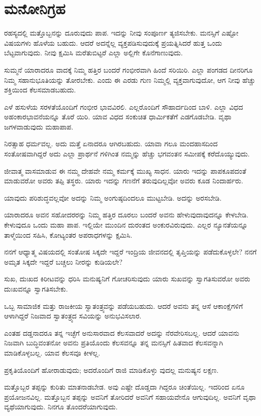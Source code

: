 \section{ಮನೋನಿಗ್ರಹ}

ರಹಸ್ಯದಲ್ಲಿ ಮತ್ತೊಬ್ಬನನ್ನು ದೂರುವುದು ಪಾಪ. ಇದನ್ನು ನೀವು ಸಂಪೂರ್ಣ ತ್ಯಜಿಸಬೇಕು. ಮನಸ್ಸಿಗೆ ಎಷ್ಟೋ ವಿಷಯಗಳು ಹೊಳೆಯ ಬಹುದು. ಆದರೆ ಅದನ್ನೆಲ್ಲ ವ್ಯಕ್ತಪಡಿಸುವುದುಕ್ಕೆ ಪ್ರಯತ್ನಿಸಿದರೆ ಹುತ್ತ ಒಂದು ಬೆಟ್ಟವಾಗುವುದು. ನೀವು ಕ್ಷಮಿಸಿ ಮರೆತುಬಿಟ್ಟರೆ ಎಲ್ಲಾ ಅಲ್ಲಿಗೇ ಕೊನೆಗಾಣುವುದು.

ಸುಮ್ಮನೆ ಯಾರಾದರೂ ವಾದಕ್ಕೆ ನಿಮ್ಮ ಹತ್ತಿರ ಬಂದರೆ ಗಂಭೀರವಾಗಿ ಹಿಂದೆ ಸರಿಯಿರಿ. ಎಲ್ಲಾ ಪಂಗಡದ ದೀನರಿಗೂ ನಿಮ್ಮ ಸಹಾನುಭೂತಿಯನ್ನು ತೋರಬೇಕು. ಎಂದು ಈ ಎರಡು ಗುಣ ನಿಮ್ಮಲ್ಲಿ ವ್ಯಕ್ತವಾಗುವುದೋ, ಆಗ ನೀವು ಹೆಚ್ಚು ಶಕ್ತಿಯಿಂದ ಕೆಲಸಮಾಡಬಹುದು.

ಎಳೆ ಹಸುಳೆಯ ಸರಳತೆಯೊಂದಿಗೆ ಗಂಭೀರ ಭಾವವಿರಲಿ. ಎಲ್ಲರೊಂದಿಗೆ ಸೌಹಾರ್ದದಿಂದ ಬಾಳಿ. ಎಲ್ಲಾ ವಿಧದ ಅಹಂಕಾರಭಾವನೆಯನ್ನೂ ತೊರೆ ಯಿರಿ. ಯಾವ ವಿಧದ ಸಂಕುಚಿತ ಧಾರ್ಮಿಕತೆಗೆ ಎಡಗೊಡಬೇಡಿ. ವೃಥಾ ಜಗಳವಾಡುವುದು ಮಹಾಪಾಪ.

ನಿರತ್ಸಾಹ ಧರ್ಮವಲ್ಲ. ಅದು ಮತ್ತೆ ಏನಾದರೂ ಆಗಿರಬಹುದು. ಯಾವಾ ಗಲೂ ಮಂದಹಾಸದಿಂದ ಸಂತೋಷವಾಗಿದ್ದರೆ ಅದು ಎಲ್ಲಾ ಪ್ರಾರ್ಥನೆ ಗಳಿಗಿಂತ ನಮ್ಮನ್ನು ಹೆಚ್ಚು ಭಗವಂತನ ಸಮೀಪಕ್ಕೆ ಕರೆದೊಯ್ಯುವುದು.

ಜೀವಾತ್ಮ ವಾಸಮಾಡುವ ಈ ನಮ್ಮ ದೇಹವೇ ನಮ್ಮ ಕರ್ಮಕ್ಕೆ ಮುಖ್ಯ ಸಾಧನ. ಯಾರು ಇದನ್ನು ಪಾಪಕೂಪದಂತೆ ಮಾಡುವರೋ ಅವರು ತಪ್ಪಿ ತಸ್ಥರು. ಯಾರು ಇದನ್ನು ಗಣನೆಗೆ ತರುವುದಿಲ್ಲವೋ ಅವರು ಕೂಡ ನಿಂದಾರ್ಹರು.

ಯಾವುದು ಪರಿಶುದ್ಧವಲ್ಲವೋ ಅದನ್ನು ನಿಮ್ಮ ಅಂಗುಷ್ಠದಿಂದಲೂ ಮುಟ್ಟಬೇಡಿ. ಅದನ್ನು ಅರಸಬೇಡಿ.

ಯಾರಾದರೂ ಅವನ ಸಹೋದರರನ್ನು ನಿಮ್ಮ ಹತ್ತಿರ ದೂರಲು ಬಂದರೆ ಅವನು ಹೇಳುವುದಾವುದನ್ನೂ ಕೇಳಬೇಡಿ. ಕೇಳುವುದೂ ಒಂದು ಮಹಾ ಪಾಪ. ಇಲ್ಲಿಯೇ ಮುಂದಿನ ದುರಂತದ ಅಂಕುರವಿರುವುದು. ಎಲ್ಲರ ನ್ಯೂನತೆಯನ್ನೂ ತಾಳ್ಮೆಯಿಂದ ಸಹಿಸಿ, ಕೋಟ್ಯಂತರ ಅಪರಾಧಗಳನ್ನು ಕ್ಷಮಿಸಿ.

ನನಗೆ ಆಧ್ಯಾತ್ಮ ವಿಷಯದಲ್ಲಿ ಸಂತೋಷ ಸಿಕ್ಕದೇ ಇದ್ದರೆ ಇಂದ್ರಿಯ ಜೀವನದಲ್ಲಿ ತೃಪ್ತಿಯನ್ನು ಪಡೆದುಕೊಳ್ಳಲೇ? ನನಗೆ ಅಮೃತ ಸಿಕ್ಕದೇ ಇದ್ದರೆ ಬಚ್ಚಲು ನೀರನ್ನು ಕುಡಿಯಲೇ?

ಸುಖ, ದುಃಖದ ಕಿರೀಟವನ್ನು ಧರಿಸಿ ಮನುಷ್ಯನಿಗೆ ಗೋಚರಿಸುವುದು ಯಾರು ಸುಖವನ್ನು ಸ್ವಾಗತಿಸುವರೋ ಅವರು ದುಃಖವನ್ನೂ ಸ್ವಾಗತಿಸಬೇಕು.

ಒಬ್ಬ ಸಾಮಾಜಿಕ ಮತ್ತು ರಾಜಕೀಯ ಸ್ವಾತಂತ್ರ್ಯವನ್ನು ಪಡೆಯಬಹುದು. ಆದರೆ ಅವನು ತನ್ನ ಆಸೆ ಆಕಾಂಕ್ಷೆಗಳಿಗೆ ಆಳಾಗಿದ್ದರೆ ನಿಜವಾದ ಸ್ವಾತಂತ್ರ್ಯದ ಸವಿಯನ್ನು ಅನುಭವಿಸಲಾರ.

ಎಂತಹ ದಡ್ಡನಾದರೂ ತನ್ನ ಇಚ್ಛೆಗೆ ಅನುಸಾರವಾದ ಕೆಲಸವಾದರೆ ಅದನ್ನು ನೆರವೇರಿಸಬಲ್ಲ. ಆದರೆ ಯಾವನು ನಿಜವಾಗಿ ಬುದ್ಧಿವಂತನೋ ಅವನು ಪ್ರತಿಯೊಂದು ಕೆಲಸವನ್ನೂ ತನ್ನ ಮನಸ್ಸಿಗೆ ಹಿತವಾದ ಕೆಲಸವನ್ನಾಗಿ ಮಾಡಿಕೊಳ್ಳಬಲ್ಲ. ಯಾವ ಕೆಲಸವೂ ಕೀಳಲ್ಲ.

ಪ್ರಕೃತಿಯೊಂದಿಗೆ ಹೋರಾಡುವುದು; ಅದರೊಂದಿಗೆ ರಾಜಿ ಮಾಡಿಕೊಳ್ಳು ವುದಲ್ಲ ಮನುಷ್ಯನ ಲಕ್ಷಣ.

ಮತ್ತೊಬ್ಬರ ತಪ್ಪನ್ನು ಕುರಿತು ಮಾತನಾಡಬೇಡ. ಅವು ಎಷ್ಟೇ ದೊಡ್ಡದಾ ಗಿದ್ದರೂ ಚಿಂತೆಯಿಲ್ಲ. ಇದರಿಂದ ಏನೂ ಪ್ರಯೋಜನವಿಲ್ಲ. ಮತ್ತೊಬ್ಬನ ತಪ್ಪನ್ನು ಅವನಿಗೆ ತೋರಿದರೆ ಅವನಿಗೆ ಸಹಾಯವೇನೊ ಆಗುವುದಿಲ್ಲ. ಅವನಿಗೆ ವೃಥಾ ವ್ಯಥೆಯಾಗುವುದು. ನಿನಗೂ ತೊಂದರೆಯಾಗುವುದು.

